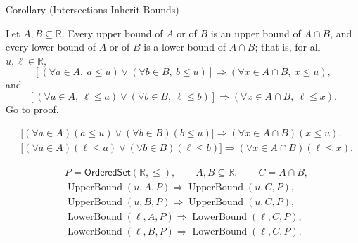 \begin{corollarybox}{Corollary (Intersections Inherit Bounds)}
\begin{corollary}
\label{cor:intersections-inherit-bounds}
Let $A,B\subseteq\mathbb{R}$. Every upper bound of $A$ or of $B$ is an
upper bound of $A\cap B$, and every lower bound of $A$ or of $B$ is a
lower bound of $A\cap B$; that is, for all $u,\ell\in\mathbb{R}$,
\[
\left[
(\forall a\in A,\ a\leq u)
\lor
(\forall b\in B,\ b\leq u)
\right]
\Longrightarrow
(\forall x\in A\cap B,\ x\leq u),
\]
and
\[
\left[
(\forall a\in A,\ \ell\leq a)
\lor
(\forall b\in B,\ \ell\leq b)
\right]
\Longrightarrow
(\forall x\in A\cap B,\ \ell\leq x).
\]
\hyperref[prf:intersections-inherit-bounds]{Go to proof.}
\end{corollary}
\end{corollarybox}

\begin{remark*}
\[
\begin{aligned}
&\bigl[(\forall a\in A)(a\leq u)\lor(\forall b\in B)(b\leq u)\bigr]
\Longrightarrow(\forall x\in A\cap B)(x\leq u),\\
&\bigl[(\forall a\in A)(\ell\leq a)\lor(\forall b\in B)(\ell\leq b)\bigr]
\Longrightarrow(\forall x\in A\cap B)(\ell\leq x).
\end{aligned}
\]
\end{remark*}

\begin{remark*}
\[
\begin{aligned}
&P=\mathsf{OrderedSet}(\mathbb{R},\leq),\qquad A,B\subseteq\mathbb{R},\qquad C=A\cap B,\\
&\operatorname{UpperBound}(u,A,P)\Longrightarrow\operatorname{UpperBound}(u,C,P),\\
&\operatorname{UpperBound}(u,B,P)\Longrightarrow\operatorname{UpperBound}(u,C,P),\\
&\operatorname{LowerBound}(\ell,A,P)\Longrightarrow\operatorname{LowerBound}(\ell,C,P),\\
&\operatorname{LowerBound}(\ell,B,P)\Longrightarrow\operatorname{LowerBound}(\ell,C,P).
\end{aligned}
\]
\end{remark*}

